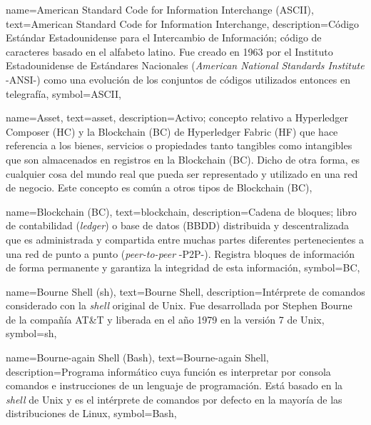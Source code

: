 {
    name={American Standard Code for Information Interchange (ASCII)},
    text={American Standard Code for Information Interchange},
    description={Código Estándar Estadounidense para el Intercambio de Información; código de caracteres basado en el alfabeto latino. Fue creado en 1963 por el Instituto Estadounidense de Estándares Nacionales (\textit{American National Standards Institute} -ANSI-) como una evolución de los conjuntos de códigos utilizados entonces en telegrafía},
    symbol={ASCII},
}

{
    name={Asset},
    text={asset},
    description={Activo; concepto relativo a Hyperledger Composer (HC) y la Blockchain (BC) de Hyperledger Fabric (HF) que hace referencia a los bienes, servicios o propiedades tanto tangibles como intangibles que son almacenados en registros en la Blockchain (BC). Dicho de otra forma, es cualquier cosa del mundo real que pueda ser representado y utilizado en una red de negocio. Este concepto es común a otros tipos de Blockchain (BC)},
}
	
{
    name={Blockchain (BC)},
    text={blockchain},
    description={Cadena de bloques; libro de contabilidad (\textit{ledger}) o base de datos (BBDD) distribuida y descentralizada que es administrada y compartida entre muchas partes diferentes pertenecientes a una red de punto a punto (\textit{peer-to-peer} -P2P-). Registra bloques de información de forma permanente y garantiza la integridad de esta información},
    symbol={BC},
}
	
{
    name={Bourne Shell (sh)},
    text={Bourne Shell},
    description={Intérprete de comandos considerado con la \textit{shell} original de Unix. Fue desarrollada por Stephen Bourne de la compañía AT\&T y liberada en el año 1979 en la versión 7 de Unix},
    symbol={sh},
}	

{
    name={Bourne-again Shell (Bash)},
    text={Bourne-again Shell},
    description={Programa informático cuya función es interpretar por consola comandos e instrucciones de un lenguaje de programación. Está basado en la \textit{shell} de Unix y es el intérprete de comandos por defecto en la mayoría de las distribuciones de Linux},
    symbol={Bash},
}	
	
